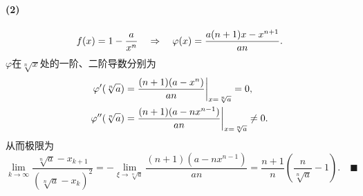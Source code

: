 \paragraph{(2)}
  \[
    \mathnormal{f}(x) = 1 - \frac{a}{x^n} \quad\Rightarrow\quad
    \varphi(x) = \frac{a(n+1)x - x^{n+1}}{an}.
  \]
  $\varphi$在$\sqrt[n]{x}$处的一阶、二阶导数分别为
  \[\begin{split}
    \varphi^{\prime}(\sqrt[n]{a}) &= \frac{(n+1)(a-x^n)}{an}\bigg|_{x=\sqrt[n]{a}} = 0, \\
    \varphi^{\prime\prime}(\sqrt[n]{a}) &= \frac{(n+1)(a-nx^{n-1})}{an}\bigg|_{x=\sqrt[n]{a}} \ne 0.
  \end{split}\]
  从而极限为
  \[
    \lim_{k\to\infty}\frac{\sqrt[n]{a} - x_{k+1}}{(\sqrt[n]{a}-x_k)^2}
    = -\lim_{\xi\to\sqrt[n]{a}}\frac{(n+1)(a-nx^{n-1})}{an}
    = \frac{n+1}{n}\left(\frac{n}{\sqrt[n]{a}} -1\right).\quad\blacksquare
  \]


